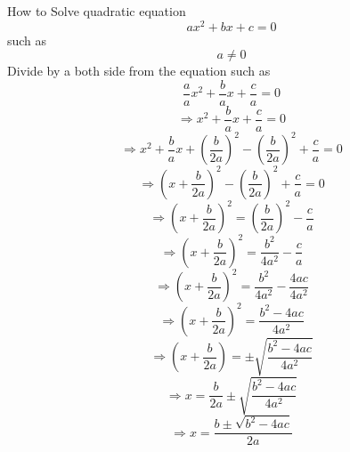 \documentclass[10pt]{article}
\begin{document}
How to Solve quadratic equation $$ax^{2}+bx+c=0$$ such as $$a \neq 0$$
Divide by a both side from the equation
such as
$$\frac{a}{a}x^2 + \frac{b}{a}x + \frac{c}{a} = 0$$
$$\Rightarrow x^{2}+\frac{b}{a}x + \frac{c}{a} = 0$$
$$\Rightarrow x^{2} + \frac{b}{a}x + (\frac{b}{2a})^2 - (\frac{b}{2a})^2 + \frac{c}{a}=0$$
$$\Rightarrow (x + \frac{b}{2a})^2 - (\frac{b}{2a})^{2} + \frac{c}{a} = 0$$
$$\Rightarrow (x + \frac{b}{2a})^2 = (\frac{b}{2a})^2 - \frac{c}{a}$$
$$\Rightarrow (x + \frac{b}{2a})^2 = \frac{b^2}{4a^{2}} - \frac{c}{a}$$
$$\Rightarrow (x + \frac{b}{2a})^2 = \frac{b^{2}}{4a^{2}} - \frac{4ac}{4a^{2}}$$
$$\Rightarrow (x + \frac{b}{2a})^2 = \frac{b^{2} - 4ac}{4a^{2}}$$
$$\Rightarrow (x + \frac{b}{2a}) =\pm \sqrt{\frac{b^{2} - 4ac}{4a^{2}}}$$
$$\Rightarrow x = \frac{b}{2a} \pm \sqrt{\frac{b^{2} - 4ac}{4a^{2}}}$$
$$\Rightarrow x = \frac{b\pm\sqrt{b^{2} - 4ac}}{2a}$$
\end{document}
